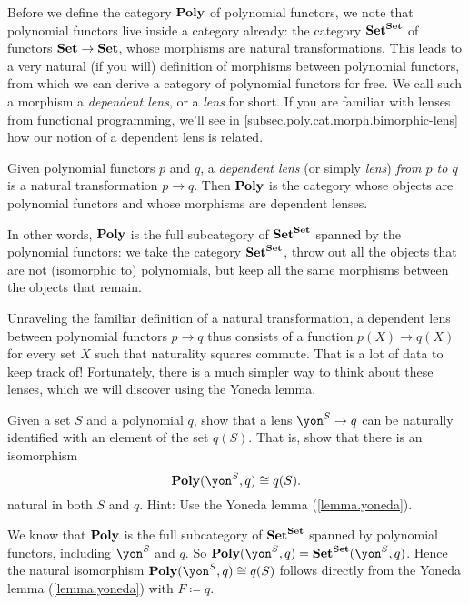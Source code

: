 \documentclass[Book-Poly]{subfiles}
\begin{document}
Before we define the category $\mathbf{Poly}$ of polynomial functors, we note that polynomial functors live inside a category already: the category $\mathbf{Set}^{\mathbf{Set}}$ of functors $\mathbf{Set}\to\mathbf{Set}$, whose morphisms are natural transformations.
This leads to a very natural (if you will) definition of morphisms between polynomial functors, from which we can derive a category of polynomial functors for free.
We call such a morphism a \emph{dependent lens}, or a \emph{lens} for short.
If you are familiar with lenses from functional programming, we'll see in \cref{subsec.poly.cat.morph.bimorphic-lens} how our notion of a dependent lens is related.

\begin{definition} \label{def.poly_cat}
Given polynomial functors $p$ and $q$, a \emph{dependent lens} (or simply \emph{lens}) \emph{from $p$ to $q$} is a natural transformation $p\to q$.
Then $\mathbf{Poly}$ is the category whose objects are polynomial functors and whose morphisms are dependent lenses.
\end{definition}

In other words, $\mathbf{Poly}$ is the full subcategory of $\mathbf{Set}^{\mathbf{Set}}$ spanned by the polynomial functors: we take the category $\mathbf{Set}^{\mathbf{Set}}$, throw out all the objects that are not (isomorphic to) polynomials, but keep all the same morphisms between the objects that remain.

Unraveling the familiar definition of a natural transformation, a dependent lens between polynomial functors $p \to q$ thus consists of a function $p(X) \to q(X)$ for every set $X$ such that naturality squares commute.
That is a lot of data to keep track of!
Fortunately, there is a much simpler way to think about these lenses, which we will discover using the Yoneda lemma.

\begin{exercise} \label{exc.poly_morph_yoneda}
Given a set $S$ and a polynomial $q$, show that a lens $\yon^S \to q$ can be naturally identified with an element of the set $q(S)$.
That is, show that there is an isomorphism
\[
    \poly(\yon^S, q) \iso q(S).
\]
natural in both $S$ and $q$.
Hint: Use the Yoneda lemma (\cref{lemma.yoneda}).
\begin{solution}
We know that $\mathbf{Poly}$ is the full subcategory of $\mathbf{Set}^{\mathbf{Set}}$ spanned by polynomial functors, including $\yon^S$ and $q$.
So $\poly(\yon^S, q)=\smset^\smset(\yon^S, q)$.
Hence the natural isomorphism $\poly(\yon^S, q)\iso q(S)$ follows directly from the Yoneda lemma (\cref{lemma.yoneda}) with $F\coloneqq q$.
\end{solution}
\end{exercise}
\end{document}
